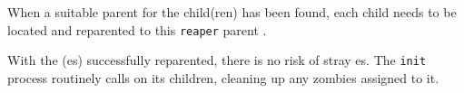 When a suitable parent for the child(ren) has been found, each child needs to be located and reparented to this \texttt{reaper} parent .

With the (es) successfully reparented, there is no risk of stray es.
The \texttt{init} process routinely calls  on its children, cleaning up any zombies assigned to it.

